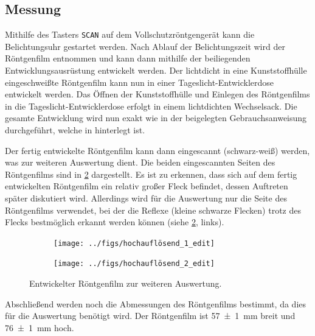 \subsection{Messung}\label{subsec:laue_messung}
Mithilfe des Tasters \texttt{SCAN} auf dem Vollschutzröntgengerät kann die Belichtungsuhr gestartet werden. Nach Ablauf der Belichtungszeit wird der Röntgenfilm entnommen
und kann dann mithilfe der beiliegenden Entwicklungsausrüstung entwickelt werden. Der lichtdicht in eine Kunststoffhülle eingeschweißte Röntgenfilm kann nun
in einer Tageslicht-Entwicklerdose entwickelt werden. Das Öffnen der Kunststoffhülle und Einlegen des Röntgenfilms in die Tageslicht-Entwicklerdose erfolgt
in einem lichtdichten Wechselsack. Die gesamte Entwicklung wird nun exakt wie in der beigelegten Gebrauchsanweisung durchgeführt, welche in \cite{film_anleitung} hinterlegt ist.\par
Der fertig entwickelte Röntgenfilm kann dann eingescannt (schwarz-weiß) werden, was zur weiteren Auswertung dient. Die beiden eingescannten Seiten des Röntgenfilms sind
in \cref{fig:eingescannter_film} dargestellt. Es ist zu erkennen, dass sich auf dem fertig entwickelten Röntgenfilm ein relativ großer Fleck befindet, dessen Auftreten später
diskutiert wird. Allerdings wird für die Auswertung nur die Seite des Röntgenfilms verwendet, bei der die Reflexe (kleine schwarze Flecken) trotz des Flecks bestmöglich erkannt werden können (siehe \cref{fig:eingescannter_film}, links).
\begin{figure}[H]
    \centering
    \begin{subfigure}{0.45\textwidth}
        \centering
        \texttt{[image: ../figs/hochauflösend\_1\_edit]}
        \caption{}\label{fig:links}
    \end{subfigure}
    \begin{subfigure}{0.45\textwidth}
        \centering
        \texttt{[image: ../figs/hochauflösend\_2\_edit]}
        \caption{}
    \end{subfigure}
    \caption{Entwickelter Röntgenfilm zur weiteren Auswertung.}\label{fig:eingescannter_film}
\end{figure} Abschließend werden noch die Abmessungen des Röntgenfilms bestimmt, da dies für die Auswertung benötigt wird. Der Röntgenfilm ist \SI{57(1)}{\milli \meter} breit und \SI{76(1)}{\milli \meter} hoch.
